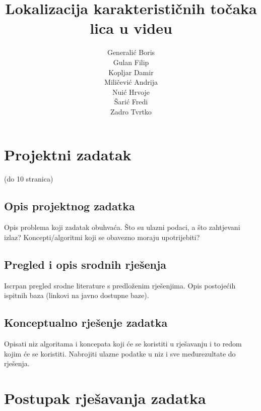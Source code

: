 \documentclass[times, utf8, diplomski]{fer}
\begin{document}
\title{ Lokalizacija karakterističnih točaka lica u videu }

\author{ \begin{tabular}{ l }
	Generalić Boris \\
	Gulan Filip \\
	Kopljar Damir \\
	Miličević Andrija \\
	Nuić Hrvoje \\
	Šarić Fredi \\
	Zadro Tvrtko \\
\end{tabular}  }

\maketitle
\tableofcontents

\chapter{Projektni zadatak}

(do 10 stranica)

\section{Opis projektnog zadatka}

Opis problema koji zadatak obuhvaća. Što su ulazni podaci, a što zahtjevani izlaz? Koncepti/algoritmi koji se obavezno moraju upotrijebiti?

\section{Pregled i opis srodnih rješenja}

Iscrpan pregled srodne literature s predloženim rješenjima. Opis postojećih ispitnih baza (linkovi na javno dostupne baze).

\section{Konceptualno rješenje zadatka}

Opisati niz algoritama i koncepata koji će se koristiti u rješavanju i to redom kojim će se koristiti. Nabrojiti ulazne podatke u niz i sve međurezultate do rješenja.

\chapter{Postupak rješavanja zadatka}
\end{document}
